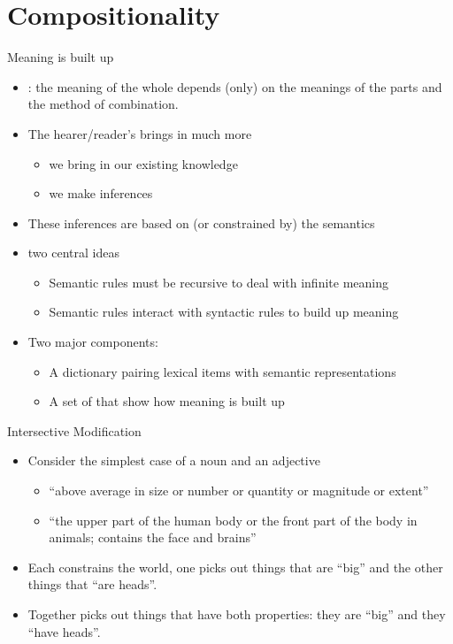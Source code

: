 
\section{Compositionality}





\begin{frame}{Meaning is built up}

\begin{itemize}
\item {}: the meaning of the whole depends (only)
  on the meanings of the parts and the method of combination.
\item The hearer/reader's  brings in much more
  \begin{itemize}
  \item we bring in our existing knowledge
  \item we make inferences
  \end{itemize}
\item These inferences are based on (or constrained by) the semantics 
\item two central ideas \citep[formalized by: ][]{Katz:Fodor:1963}
  \begin{itemize}
  \item Semantic rules must be recursive to deal with infinite meaning
  \item Semantic rules interact with syntactic rules to build up meaning
  \end{itemize}
\item Two major components:
  \begin{itemize}
  \item A dictionary pairing lexical items with semantic representations
  \item A set of  that show how meaning is built up
  \end{itemize}
\end{itemize}

\end{frame}

\begin{frame}{Intersective Modification}

\begin{itemize}
\item Consider the simplest case of a noun and an adjective
  \begin{itemize}
  \item {} ``above average in size or number or quantity or magnitude or extent''
  \item {} ``the upper part of the human body or the front part of the body in animals; contains the face and brains''
  \end{itemize}
\item Each constrains the world, one picks out things that are
  ``big'' and the other things that ``are heads''.
\item Together  picks out things that have both properties: they
  are ``big'' and they ``have heads''.
\end{itemize}
\end{frame}


